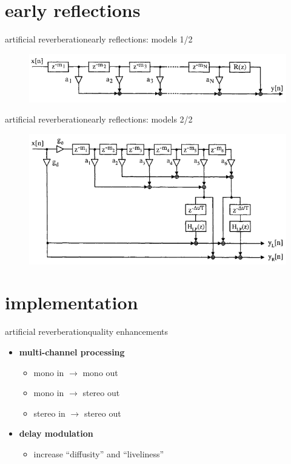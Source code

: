 \section{early reflections}
\begin{frame}{artificial reverberation}{early reflections: models 1/2}
	\begin{figure}
		\centerline{\includegraphics[scale=.6]{graph/er_simple}}
	\end{figure}
\end{frame}

\begin{frame}{artificial reverberation}{early reflections: models 2/2}
	\begin{figure}
		\centerline{\includegraphics[scale=.6]{graph/erstandard}}
	\end{figure}
\end{frame}

\section{implementation}
\begin{frame}{artificial reverberation}{quality enhancements}
	\begin{itemize}
		\item	\textbf{multi-channel processing}
			\begin{itemize}
				\item	mono in $\rightarrow$ mono out				
				\item	mono in $\rightarrow$ stereo out				
				\item	stereo in $\rightarrow$ stereo out
			\end{itemize}
		\pause
        \bigskip
		\item	\textbf{delay modulation}
			\begin{itemize}
				\item	increase ``diffusity'' and ``liveliness''
			\end{itemize}
	\end{itemize}
\end{frame}

